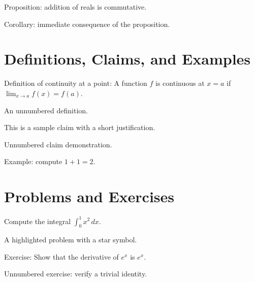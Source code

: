 \documentclass{mudasir}
\begin{document}
\begin{proposition}
Proposition: addition of reals is commutative.
\end{proposition}

\begin{corollary}
Corollary: immediate consequence of the proposition.
\end{corollary}

\section*{Definitions, Claims, and Examples}
\begin{definition}
Definition of continuity at a point: A function $f$ is continuous at $x=a$ if $\lim_{x\to a} f(x) = f(a)$.
\end{definition}

\begin{definition*}
An unnumbered definition.
\end{definition*}

\begin{claim}
This is a sample claim with a short justification.
\end{claim}

\begin{claim*}
Unnumbered claim demonstration.
\end{claim*}

\begin{example}
Example: compute $1+1=2$.
\end{example}

\section*{Problems and Exercises}
\begin{problem}
Compute the integral $\int_0^1 x^2\,dx$.
\end{problem}

\begin{niceprob}
A highlighted problem with a star symbol.
\end{niceprob}

\begin{exercise}
Exercise: Show that the derivative of $e^{x}$ is $e^{x}$.
\end{exercise}

\begin{exercise*}
Unnumbered exercise: verify a trivial identity.
\end{exercise*}
\end{document}
